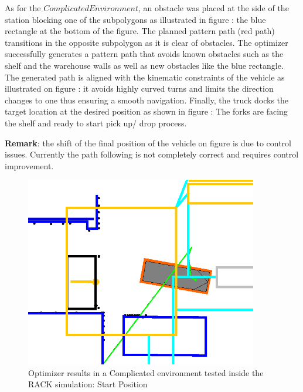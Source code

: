 As for the \(Complicated Environment\), an obstacle was placed at the side of the station 
blocking one of the subpolygons as illustrated in figure : the blue rectangle at the bottom 
of the figure.
The planned pattern path (red path) transitions in the opposite subpolygon as it is clear of obstacles.
The optimizer successfully generates a pattern path that avoids known obstacles such as the shelf and 
the warehouse walls as well as new obstacles like the blue rectangle. 
The generated path is aligned with the kinematic constraints of the vehicle as illustrated on figure : 
it avoids highly curved turns and limits the direction changes to one thus ensuring a smooth navigation.
Finally, the truck docks the target location at the desired position as shown in figure : 
The forks are facing the shelf and ready to start pick up/ drop process. 

\textbf{Remark}: the shift of the final position of the vehicle on figure  is due 
to control issues. Currently the path following is not completely correct and requires 
control improvement.

\begin{figure}[H]
    \begin{center}
        \includegraphics[width=4in]{images/Chap3/4.png} %
        \caption{Optimizer results in a Complicated environment tested inside the RACK simulation: Start Position}
        \label{OptResult6}
        \end{center}    
\end{figure}

